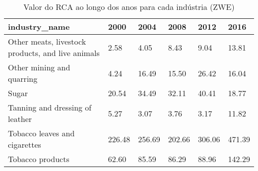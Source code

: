 \begin{table}
\centering
\caption{Valor do RCA ao longo dos anos para cada indústria (ZWE)}
\begin{tabular}{p{6cm}p{1.5cm}p{1.5cm}p{1.5cm}p{1.5cm}p{1.5cm}}
\toprule
                                    industry\_name &   2000 &   2004 &   2008 &   2012 &   2016 \\
\midrule
Other meats, livestock products, and live animals &   2.58 &   4.05 &   8.43 &   9.04 &  13.81 \\
                        Other mining and quarring &   4.24 &  16.49 &  15.50 &  26.42 &  16.04 \\
                                            Sugar &  20.54 &  34.49 &  32.11 &  40.41 &  18.77 \\
                  Tanning and dressing of leather &   5.27 &   3.07 &   3.76 &   3.17 &  11.82 \\
                    Tobacco leaves and cigarettes & 226.48 & 256.69 & 202.66 & 306.06 & 471.39 \\
                                 Tobacco products &  62.60 &  85.59 &  86.29 &  88.96 & 142.29 \\
\bottomrule
\end{tabular}
\end{table}
